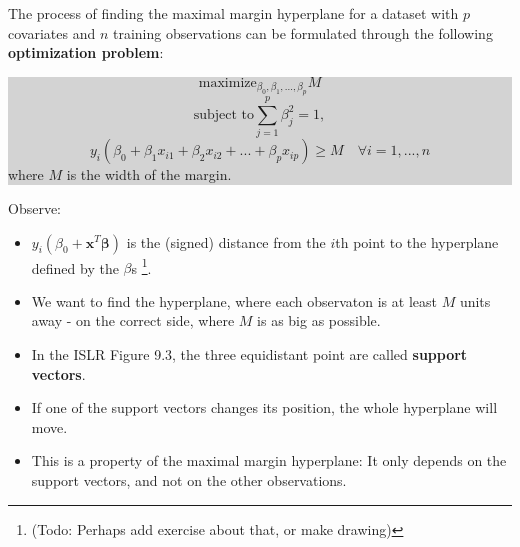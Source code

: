 \documentclass[10pt,ignorenonframetext,]{beamer}
\providecommand{\tightlist}{%
  \setlength{\itemsep}{0pt}\setlength{\parskip}{0pt}}
\begin{document}
\begin{frame}

The process of finding the maximal margin hyperplane for a dataset with
\(p\) covariates and \(n\) training observations can be formulated
through the following \textbf{optimization problem}:

\colorbox{lightgray}{\begin{minipage}{10cm}
$$\mathrm{maximize}_{\beta_0,\beta_1,...,\beta_p}  M $$
$$\text{subject to} \sum_{j=1}^p \beta_j^2=1,$$
$$y_i(\beta_0+\beta_1 x_{i1}+\beta_2 x_{i2}+...+\beta_p x_{ip})\geq M \quad  \forall i=1,...,n$$
where $M$ is the width of the margin. 
\end{minipage}}

Observe: \vspace{-2mm}

\begin{itemize}
\tightlist
\item
  \(y_i(\beta_0+{\boldsymbol x}^T {\boldsymbol \beta})\) is the (signed)
  distance from the \(i\)th point to the hyperplane defined by the
  \(\beta\)s
  \footnote{(Todo: Perhaps add exercise about that, or make drawing)}.
\item
  We want to find the hyperplane, where each observaton is at least
  \(M\) units away - on the correct side, where \(M\) is as big as
  possible.
\end{itemize}

\end{frame}

\begin{frame}

\begin{itemize}
\item
  In the ISLR Figure 9.3, the three equidistant point are called
  \textbf{support vectors}.
\item
  If one of the support vectors changes its position, the whole
  hyperplane will move.
\item
  This is a property of the maximal margin hyperplane: It only depends
  on the support vectors, and not on the other observations.
\end{itemize}

\end{frame}
\end{document}
